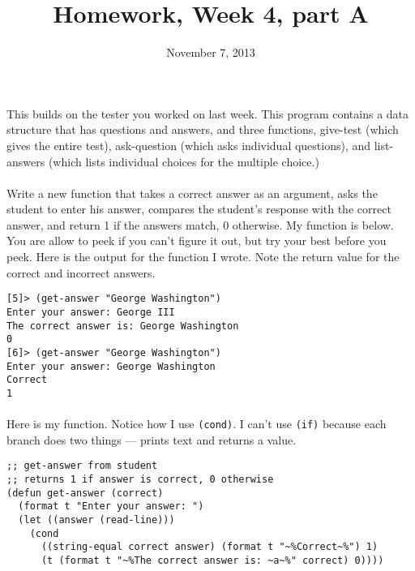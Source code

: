 \documentclass{article}
\title{Homework, Week 4, part A}
\date{November 7, 2013}
\begin{document}
\maketitle{}

\paragraph{}This builds on the tester you worked on last week. This program contains a data structure that has questions and answers, and three functions, give-test (which gives the entire test), ask-question (which asks individual questions), and list-answers (which lists individual choices for the multiple choice.)

\paragraph{}Write a new function that takes a correct answer as an argument, asks the student to enter his answer, compares the student's response with the correct answer, and return 1 if the answers match, 0 otherwise. My function is below. You are allow to peek if you can't figure it out, but try your best before you peek.  Here is the output for the function I wrote. Note the return value for the correct and incorrect answers.

\lstset{language=Lisp,numbers=left,keepspaces=false,basicstyle=\small,numberstyle=\tiny,breaklines=true,showstringspaces=false}
\begin{lstlisting}
[5]> (get-answer "George Washington")
Enter your answer: George III
The correct answer is: George Washington
0
[6]> (get-answer "George Washington")
Enter your answer: George Washington
Correct
1
\end{lstlisting}

\paragraph{}Here is my function. Notice how I use \texttt{(cond)}. I can't use \texttt{(if)} because each branch does two things --- prints text and returns a value.

\lstset{language=Lisp,numbers=left,keepspaces=false,basicstyle=\small,numberstyle=\tiny,breaklines=true,showstringspaces=false}
\begin{lstlisting}
;; get-answer from student
;; returns 1 if answer is correct, 0 otherwise
(defun get-answer (correct)
  (format t "Enter your answer: ")
  (let ((answer (read-line)))
    (cond 
      ((string-equal correct answer) (format t "~%Correct~%") 1)
      (t (format t "~%The correct answer is: ~a~%" correct) 0))))
\end{lstlisting}
\end{document}
